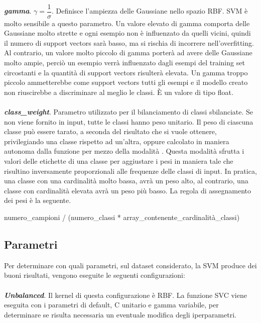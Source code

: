 \documentclass[12pt,a4paper,oneside,hidelinks]{report}
\begin{document}
\paragraph*{}
\textbf{\textit{gamma}}. $\gamma = \dfrac{1}{\sigma}$. Definisce l'ampiezza delle Gaussiane nello spazio RBF. SVM è molto sensibile a questo parametro. Un valore elevato di gamma comporta delle Gaussiane molto strette e ogni esempio non è influenzato da quelli vicini, quindi il numero di support vectors sarà basso, ma si rischia di incorrere nell'overfitting. Al contrario, un valore molto piccolo di gamma porterà ad avere delle Gaussiane molto ampie, perciò un esempio verrà influenzato dagli esempi del training set circostanti e la quantità di support vectors risulterà elevata. Un gamma troppo piccolo ammetterebbe come support vectors tutti gli esempi e il modello creato non riuscirebbe a discriminare al meglio le classi. È un valore di tipo float.

\paragraph*{}
\textbf{\textit{class\_weight}}. Parametro utilizzato per il bilanciamento di classi sbilanciate. Se non viene fornito in input, tutte le classi hanno peso unitario. Il peso di ciascuna classe può essere tarato, a seconda del risultato che si vuole ottenere, privilegiando una classe rispetto ad un'altra, oppure calcolato in maniera autonoma dalla funzione per mezzo della modalità . 
Questa modalità sfrutta i valori delle etichette di una classe per aggiustare i pesi in maniera tale che risultino inversamente proporzionali alle frequenze delle classi di input. In pratica, una classe con una cardinalità molto bassa, avrà un peso alto, al contrario, una classe con cardinalità elevata avrà un peso più basso. La regola di assegnamento dei pesi è la seguente.

\begin{center}
numero\_campioni / (numero\_classi * array\_contenente\_cardinalità\_classi)
\end{center}


\subsection{Parametri}
Per determinare con quali parametri, sul dataset considerato, la SVM produce dei buoni risultati, vengono eseguite le seguenti configurazioni:

\paragraph*{}
\textbf{\textit{Unbalanced}}. Il kernel di questa configurazione è RBF. La funzione SVC viene eseguita con i parametri di default, C unitario e gamma variabile, per determinare se risulta necessaria un eventuale modifica degli iperparametri.
\end{document}
